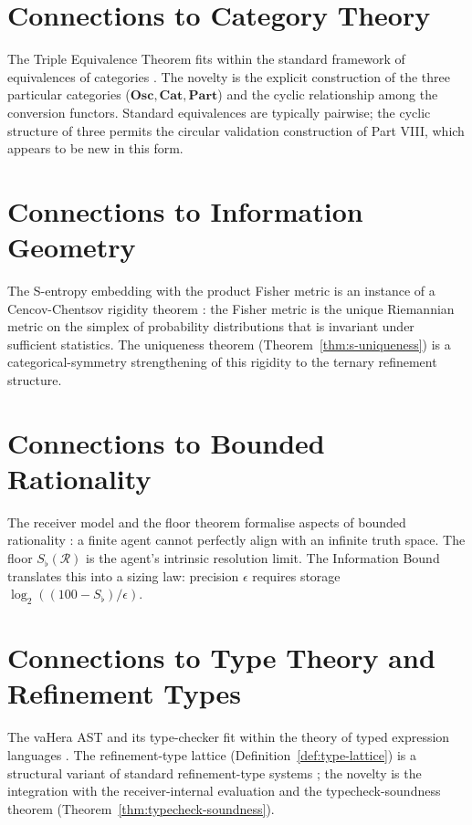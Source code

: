 \documentclass[twocolumn,a4paper]{article}
\newcommand{\receiver}{\mathcal{R}}
\newcommand{\Sfloor}{S_{\flat}}
\begin{document}
\section{Connections to Category Theory}
\label{sec:cat-theory}

The Triple Equivalence Theorem fits within the standard framework of equivalences of categories \citep{maclane1998categories,borceux1994handbook}. The novelty is the explicit construction of the three particular categories ($\mathbf{Osc},\mathbf{Cat},\mathbf{Part}$) and the cyclic relationship among the conversion functors. Standard equivalences are typically pairwise; the cyclic structure of three permits the circular validation construction of Part VIII, which appears to be new in this form.

\section{Connections to Information Geometry}
\label{sec:info-geom}

The S-entropy embedding with the product Fisher metric is an instance of a Cencov-Chentsov rigidity theorem \citep{cencov2000statistical,amari2016information}: the Fisher metric is the unique Riemannian metric on the simplex of probability distributions that is invariant under sufficient statistics. The uniqueness theorem (Theorem~\ref{thm:s-uniqueness}) is a categorical-symmetry strengthening of this rigidity to the ternary refinement structure.

\section{Connections to Bounded Rationality}
\label{sec:bounded-rationality}

The receiver model and the floor theorem formalise aspects of bounded rationality \citep{simon1955behavioral,lipman1995information,gigerenzer1996reasoning}: a finite agent cannot perfectly align with an infinite truth space. The floor $\Sfloor(\receiver)$ is the agent's intrinsic resolution limit. The Information Bound translates this into a sizing law: precision $\epsilon$ requires storage $\log_{2}((100-\Sfloor)/\epsilon)$.

\section{Connections to Type Theory and Refinement Types}
\label{sec:type-theory}

The vaHera AST and its type-checker fit within the theory of typed expression languages \citep{pierce2002types,plotkin1977lcf}. The refinement-type lattice (Definition~\ref{def:type-lattice}) is a structural variant of standard refinement-type systems \citep{rondon2008liquid,vazou2014refinement}; the novelty is the integration with the receiver-internal evaluation and the typecheck-soundness theorem (Theorem~\ref{thm:typecheck-soundness}).
\end{document}
